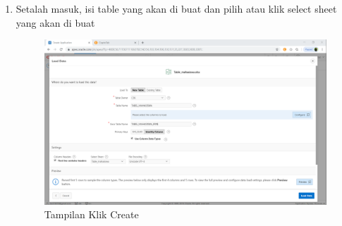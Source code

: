 \documentclass{article}
\begin{document}
\begin{enumerate}
	\item Setalah masuk, isi table yang akan di buat dan pilih atau klik select sheet yang akan di buat
	\begin{figure}[h]
	\centering
		\includegraphics[scale=0.5]{gambar/6.PNG}
		\caption{Tampilan Klik Create}
\end{figure}
\\
\\
\\
\\
\\
\\
\\
\\
\\
\\
\\
\\
\\
\\
\\
\\


\end{enumerate}
\end{document}
